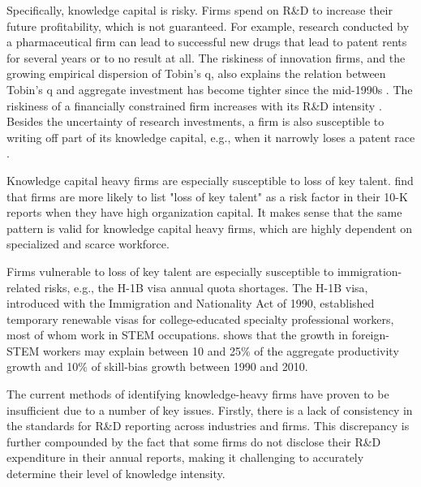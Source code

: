 \documentclass[12pt, letterpaper]{article}
\begin{document}
Specifically, knowledge capital is risky. Firms spend on R\&D to increase their future profitability, which is not guaranteed. For example, research conducted by a pharmaceutical firm can lead to successful new drugs that lead to patent rents for several years or to no result at all. The riskiness of innovation firms, and the growing empirical dispersion of Tobin's q, also explains the relation between Tobin's q and aggregate investment has become tighter since the mid-1990s \citep{Andrei2019-bh}. The riskiness of a financially constrained firm increases with its R\&D intensity \citep{Li2011-ay}. Besides the uncertainty of research investments, a firm is also susceptible to writing off part of its knowledge capital, e.g., when it narrowly loses a patent race \citep{Peters2017-fl}.

Knowledge capital heavy firms are especially susceptible to loss of key talent. \cite{Eisfeldt2013-ad} find that firms are more likely to list "loss of key talent" as a risk factor in their 10-K reports when they have high organization capital. It makes sense that the same pattern is valid for knowledge capital heavy firms, which are highly dependent on specialized and scarce workforce.

Firms vulnerable to loss of key talent are especially susceptible to immigration-related risks, e.g., the H-1B visa annual quota shortages. The H-1B visa, introduced with the Immigration and Nationality Act of 1990, established temporary renewable visas for college-educated specialty professional workers, most of whom work in STEM occupations. \cite{Peri2015-qt} shows that the growth in foreign-STEM workers may explain between 10 and 25\% of the aggregate productivity growth and 10\% of skill-bias growth between 1990 and 2010.


The current methods of identifying knowledge-heavy firms have proven to be insufficient due to a number of key issues. Firstly, there is a lack of consistency in the standards for R\&D reporting across industries and firms. This discrepancy is further compounded by the fact that some firms do not disclose their R\&D expenditure in their annual reports, making it challenging to accurately determine their level of knowledge intensity.
\end{document}
